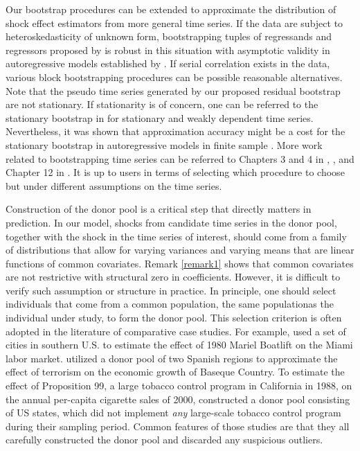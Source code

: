\documentclass[11pt,3p,review,authoryear]{elsarticle}
\theoremstyle{definition}
\begin{document}
Our bootstrap procedures can be extended to approximate the distribution of shock effect estimators from more general time series. If the data are subject to heteroskedasticity of unknown form, bootstrapping tuples of regressands and regressors proposed by \citet{freedman1981bootstrapping} is robust in this situation with asymptotic validity in autoregressive models established by \citet{gonccalves2004bootstrapping}. If serial correlation exists in the data, various block bootstrapping procedures \citep{kunsch1989jackknife, liu1992moving} can be possible reasonable alternatives. Note that the pseudo time series generated by our proposed residual bootstrap are not stationary. If stationarity is of concern, one can be referred to the stationary bootstrap in \citet{politis1994stationary} for stationary and weakly dependent time series. Nevertheless, it was shown that approximation accuracy might be a cost for the stationary bootstrap in autoregressive  models in finite sample \citep{berkowitz1999finite}.  More work related to bootstrapping time series  can be referred to Chapters 3 and 4 in \citet{politis1999subsampling}, \citet{berkowitz2000recent}, and Chapter 12 in \citet{kilian2017structural}. It is up to  users in terms of selecting which procedure to choose but under different assumptions on the time series.


Construction of the donor pool is a critical step that directly matters in prediction. In our model, shocks from candidate time series in the donor pool, together with the shock in the time series of interest, should come from a family of distributions that allow for  varying variances and  varying means that are linear functions of common covariates. Remark \ref{remark1} shows that common covariates are not restrictive with structural zero in coefficients. However, it is difficult to verify such assumption or structure in practice. In principle, one should select individuals that come from a common population, the same populationas the individual under study, to form the donor pool. This selection criterion is often adopted in the literature of comparative case studies. For example, \citet{card1990impact} used a set of cities in southern U.S. to estimate the effect of 1980 Mariel Boatlift on the Miami labor market. \citet{abadie2003economic} utilized a donor pool of two Spanish regions to approximate the effect of terrorism on  the economic growth of Baseque Country. To estimate the effect of Proposition 99, a large tobacco control program in California  in 1988, on the annual per-capita cigarette sales of 2000, \cite{abadie2010synthetic} constructed a donor pool consisting of US states, which did not implement \emph{any} large-scale tobacco control program during their sampling period. Common features of those studies are that they all carefully constructed the donor pool and discarded any suspicious outliers. 
\end{document}
